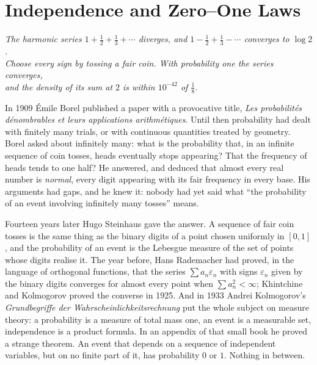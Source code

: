 \chapter{Independence and Zero--One Laws}
\begin{center}\itshape
The harmonic series $1+\frac12+\frac13+\cdots$ diverges, and $1-\frac12+\frac13-\cdots$ converges to $\log2$.\\
Choose every sign by tossing a fair coin. With probability one the series converges,\\
and the density of its sum at $2$ is within $10^{-42}$ of $\frac18$.
\end{center}

In 1909 \'Emile Borel published a paper with a provocative title, \emph{Les probabilit\'es d\'enombrables et leurs applications
arithm\'etiques}. Until then probability had dealt with finitely many trials, or with continuous quantities treated by
geometry. Borel asked about infinitely many: what is the probability that, in an infinite sequence of coin tosses, heads
eventually stops appearing? That the frequency of heads tends to one half? He answered, and deduced that almost every real
number is \emph{normal}, every digit appearing with its fair frequency in every base. His arguments had gaps, and he knew
it: nobody had yet said what ``the probability of an event involving infinitely many tosses'' means.

Fourteen years later Hugo Steinhaus gave the answer. A sequence of fair coin tosses is the same thing as the binary digits
of a point chosen uniformly in $[0,1]$, and the probability of an event is the Lebesgue measure of the set of points
whose digits realise it. The year before, Hans Rademacher had proved, in the language of orthogonal functions, that the
series $\sum a_n\varepsilon_n$ with signs $\varepsilon_n$ given by the binary digits converges for almost every point when
$\sum a_n^2<\infty$; Khintchine and Kolmogorov proved the converse in 1925. And in 1933 Andrei Kolmogorov's
\emph{Grundbegriffe der Wahrscheinlichkeitsrechnung} put the whole subject on measure theory: a probability is a measure
of total mass one, an event is a measurable set, independence is a product formula. In an appendix of that small book he
proved a strange theorem. An event that depends on a sequence of independent variables, but on no finite part of it, has
probability $0$ or $1$. Nothing in between.

